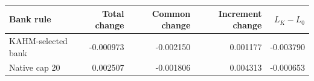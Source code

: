 \begin{tabular}{@{}lrrrr@{}}
\toprule
Bank rule & Total change & Common change & Increment change & $L_K-L_0$ \\
\midrule
KAHM-selected bank & -0.000973 & -0.002150 & 0.001177 & -0.003790 \\
Native cap 20 & 0.002507 & -0.001806 & 0.004313 & -0.000653 \\
\bottomrule
\end{tabular}
